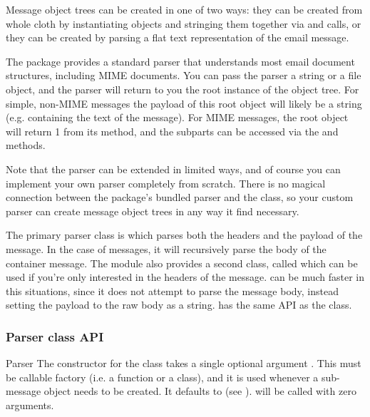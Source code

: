 
Message object trees can be created in one of two ways: they can be
created from whole cloth by instantiating  objects and
stringing them together via  and
 calls, or they can be created by parsing a flat text
representation of the email message.

The  package provides a standard parser that understands
most email document structures, including MIME documents.  You can
pass the parser a string or a file object, and the parser will return
to you the root  instance of the object tree.  For
simple, non-MIME messages the payload of this root object will likely
be a string (e.g. containing the text of the message).  For MIME
messages, the root object will return 1 from its
 method, and the subparts can be accessed via
the  and  methods.

Note that the parser can be extended in limited ways, and of course
you can implement your own parser completely from scratch.  There is
no magical connection between the  package's bundled
parser and the  class, so your custom parser can create
message object trees in any way it find necessary.

The primary parser class is  which parses both the
headers and the payload of the message.  In the case of
 messages, it will recursively parse the body of
the container message.  The  module also provides
a second class, called  which can be used if
you're only interested in the headers of the message.
 can be much faster in this situations, since it
does not attempt to parse the message body, instead setting the
payload to the raw body as a string.   has the
same API as the  class.

\subsubsection{Parser class API}

\begin{classdesc}{Parser}{}
The constructor for the  class takes a single optional
argument .  This must be callable factory (i.e. a function
or a class), and it is used whenever a sub-message object needs to be
created.  It defaults to  (see
).   will be called with zero
arguments.
\end{classdesc}

